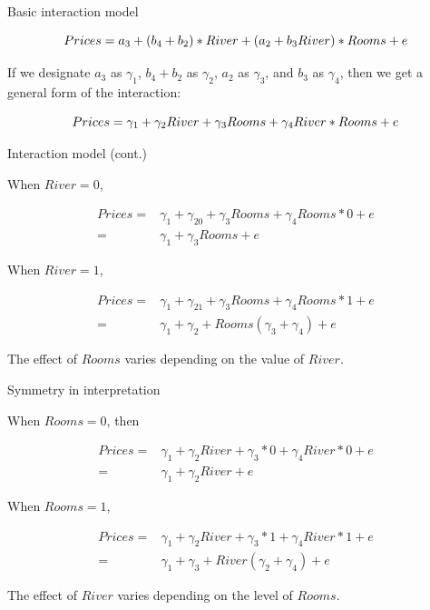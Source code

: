 \documentclass[12pt,english,pdf,xcolor=dvipsnames,aspectratio=169,handout]{beamer}\usepackage[]{graphicx}\usepackage[]{xcolor}
\begin{document}
\begin{frame}{Basic interaction model}

\begin{equation}
  \footnotesize
  Prices = a_3 + (b_4+b_2)*River + (a_2+b_3River)*Rooms + e
\end{equation}\bigskip

 If we designate $a_3$ as $\gamma_1$, $b_4+b_2$ as $\gamma_2$, $a_2$ as $\gamma_3$, and $b_3$ as $\gamma_4$, then we get a general form of the interaction:\bigskip

\begin{equation}
  \footnotesize
  Prices = \gamma_1 + \gamma_2River + \gamma_3Rooms + \gamma_4River*Rooms + e
\end{equation}
 
\end{frame}



\begin{frame}{Interaction model (cont.)}

When $River=0$,

\begin{align}
  Prices =& \gamma_1 + \gamma_20 + \gamma_3Rooms + \gamma_4Rooms*0 + e \nonumber\\
         =& \gamma_1 + \gamma_3Rooms + e
\end{align}

When $River=1$,

\begin{align}
  Prices =& \gamma_1 + \gamma_21 + \gamma_3Rooms + \gamma_4Rooms*1 + e \nonumber\\
         =& \gamma_1 + \gamma_2 + Rooms(\gamma_3 + \gamma_4) + e
\end{align}

The effect of $Rooms$ varies depending on the value of $River$.

\end{frame}




\begin{frame}{Symmetry in interpretation}

When $Rooms=0$, then

\begin{align}
  Prices =& \gamma_1 + \gamma_2River + \gamma_3*0 + \gamma_4River*0 + e \nonumber\\
         =& \gamma_1 + \gamma_2River + e \nonumber
\end{align}

When $Rooms=1$,

\begin{align}
  Prices =& \gamma_1 + \gamma_2River + \gamma_3*1 + \gamma_4River*1 + e \nonumber\\
         =& \gamma_1 + \gamma_3 + River(\gamma_2 + \gamma_4) + e \nonumber
\end{align}

The effect of $River$ varies depending on the level of $Rooms$.

\end{frame}
\end{document}
